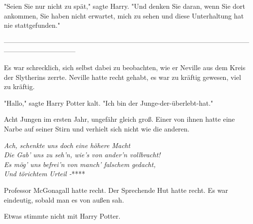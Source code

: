 {"Seien Sie nur nicht zu spät," sagte Harry. "Und denken Sie daran, wenn Sie dort ankommen, Sie haben nicht erwartet, mich zu sehen und diese Unterhaltung hat nie stattgefunden."

--------------------------------------------------------------------------------------------------------------------------------------------

Es war schrecklich, sich selbst dabei zu beobachten, wie er Neville aus dem Kreis der Slytherins zerrte. Neville hatte recht gehabt, es war zu kräftig gewesen, viel zu kräftig.

"Hallo," sagte Harry Potter kalt. "Ich bin der Junge-der-überlebt-hat."

Acht Jungen im ersten Jahr, ungefähr gleich groß. Einer von ihnen hatte eine Narbe auf seiner Stirn und verhielt sich nicht wie die anderen.

\emph{Ach, schenkte uns doch eine höhere Macht\\ Die Gab' uns zu seh'n, wie's von ander'n vollbracht!\\ Es mög' uns befrei'n von manch' falschem gedacht,\\ Und törichtem Urteil -}****

Professor McGonagall hatte recht. Der Sprechende Hut hatte recht. Es war eindeutig, sobald man es von außen sah.

Etwas stimmte nicht mit Harry Potter.

}
